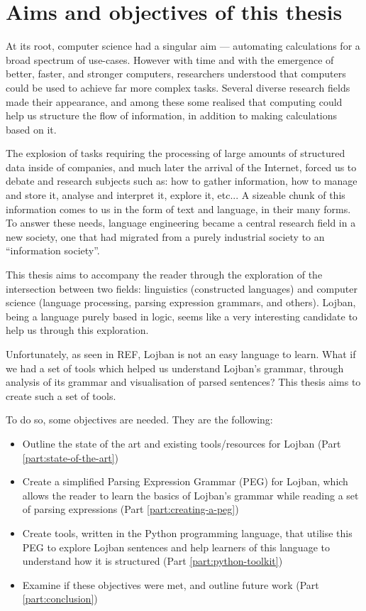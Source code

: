 \chapter{Aims and objectives of this thesis}

At its root, computer science had a singular aim --- automating calculations for a broad spectrum of use-cases.
However with time and with the emergence of better, faster, and stronger computers, researchers understood that computers could be used to achieve
far more complex tasks. Several diverse research fields made their appearance, and among these some realised that computing could help us structure the
flow of information, in addition to making calculations based on it. \newline

The explosion of tasks requiring the processing of large amounts of structured data inside of companies, and much later the arrival of the Internet,
forced us to debate and research subjects such as: how to gather information, how to manage and store it, analyse and interpret it, explore it, etc...
A sizeable chunk of this information comes to us in the form of text and language, in their many forms. To answer these needs, language engineering became a
central research field in a new society, one that had migrated from a purely industrial society to an ``information society''.\newline

This thesis aims to accompany the reader through the exploration of the intersection between two fields: linguistics (constructed languages)
and computer science (language processing, parsing expression grammars, and others). Lojban, being a language purely based in logic, seems like a very
interesting candidate to help us through this exploration. \newline

Unfortunately, as seen in REF, Lojban is not an easy language to learn. What if we had a set of tools which helped us understand Lojban's grammar,
through analysis of its grammar and visualisation of parsed sentences? This thesis aims to create such a set of tools.\newline

To do so, some objectives are needed. They are the following:
\begin{itemize}
\item Outline the state of the art and existing tools/resources for Lojban (Part \ref{part:state-of-the-art})
\item Create a simplified Parsing Expression Grammar (PEG) for Lojban, which allows the reader to learn the basics of Lojban's grammar
while reading a set of parsing expressions (Part \ref{part:creating-a-peg})
\item Create tools, written in the Python programming language, that utilise this PEG to explore Lojban sentences and help learners of this
language to understand how it is structured (Part \ref{part:python-toolkit})
\item Examine if these objectives were met, and outline future work (Part \ref{part:conclusion})
\end{itemize}